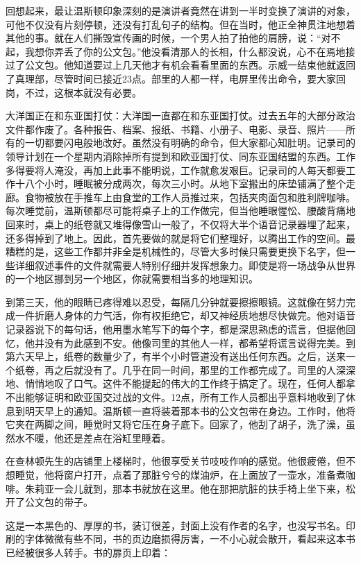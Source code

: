 回想起来，最让温斯顿印象深刻的是演讲者竟然在讲到一半时变换了演讲的对象，可他不仅没有片刻停顿，还没有打乱句子的结构。但在当时，他正全神贯注地想着其他的事。就在人们撕毁宣传画的时候，一个男人拍了拍他的肩膀，说：``对不起，我想你弄丢了你的公文包。''他没看清那人的长相，什么都没说，心不在焉地接过了公文包。他知道要过上几天他才有机会看看里面的东西。示威一结束他就返回了真理部，尽管时间已接近23点。部里的人都一样，电屏里传出命令，要大家回岗，不过，这根本就没有必要。

大洋国正在和东亚国打仗：大洋国一直都在和东亚国打仗。过去五年的大部分政治文件都作废了。各种报告、档案、报纸、书籍、小册子、电影、录音、照片——所有的一切都要闪电般地改好。虽然没有明确的命令，但大家都心知肚明。记录司的领导计划在一个星期内消除掉所有提到和欧亚国打仗、同东亚国结盟的东西。工作多得要将人淹没，再加上此事不能明说，工作就愈发艰巨。记录司的人每天都要工作十八个小时，睡眠被分成两次，每次三小时。从地下室搬出的床垫铺满了整个走廊。食物被放在手推车上由食堂的工作人员推过来，包括夹肉面包和胜利牌咖啡。每次睡觉前，温斯顿都尽可能将桌子上的工作做完，但当他睡眼惺忪、腰酸背痛地回来时，桌上的纸卷就又堆得像雪山一般了，不仅将大半个语音记录器埋了起来，还多得掉到了地上。因此，首先要做的就是将它们整理好，以腾出工作的空间。最糟糕的是，这些工作都并非全是机械性的，尽管大多时候只需要更换下名字，但一些详细叙述事件的文件就需要人特别仔细并发挥想象力。即使是将一场战争从世界的一个地区挪到另一个地区，你就需要相当多的地理知识。

到第三天，他的眼睛已疼得难以忍受，每隔几分钟就要擦擦眼镜。这就像在努力完成一件折磨人身体的力气活，你有权拒绝它，却又神经质地想尽快做完。他对语音记录器说下的每句话，他用墨水笔写下的每个字，都是深思熟虑的谎言，但据他回忆，他并没有为此感到不安。他像司里的其他人一样，都希望将谎言说得完美。到第六天早上，纸卷的数量少了，有半个小时管道没有送出任何东西。之后，送来一个纸卷，再之后就没有了。几乎在同一时间，那里的工作都完成了。司里的人深深地、悄悄地叹了口气。这件不能提起的伟大的工作终于搞定了。现在，任何人都拿不出能够证明和欧亚国交过战的文件。12点，所有工作人员都出乎意料地收到了休息到明天早上的通知。温斯顿一直将装着那本书的公文包带在身边。工作时，他将它夹在两脚之间，睡觉时又将它压在身子底下。回家了，他刮了胡子，洗了澡，虽然水不暖，他还是差点在浴缸里睡着。

在查林顿先生的店铺里上楼梯时，他很享受关节吱吱作响的感觉。他很疲倦，但不想睡觉，他将窗户打开，点着了那脏兮兮的煤油炉，在上面放了一壶水，准备煮咖啡。朱莉亚一会儿就到，那本书就放在这里。他在那把肮脏的扶手椅上坐下来，松开了公文包的带子。

这是一本黑色的、厚厚的书，装订很差，封面上没有作者的名字，也没写书名。印刷的字体微微有些不同，书的页边磨损得厉害，一不小心就会散开，看起来这本书已经被很多人转手。书的扉页上印着：

